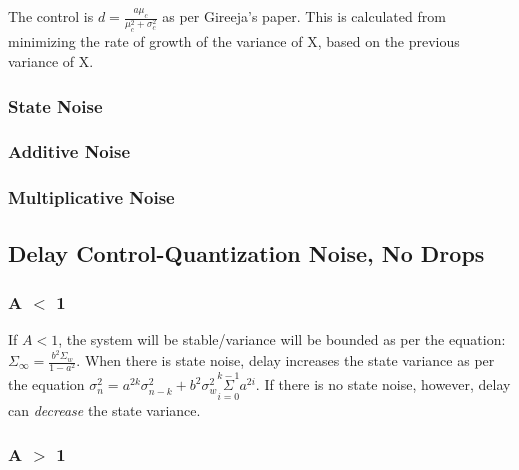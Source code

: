 \documentclass[leqno,twocolumn]{article}
\begin{document}
The control is $d = \frac{a\mu_c}{\mu_c^2+\sigma_c^2}$ as per Gireeja's paper. This is calculated from minimizing the rate of growth of the variance of X, based on the previous variance of X.

\subsubsection{State Noise}


\subsubsection{Additive Noise}

\subsubsection{Multiplicative Noise}

\subsection{Delay Control-Quantization Noise, No Drops}
\subsubsection{A $<$ 1}
If $A < 1$, the system will be stable/variance will be bounded as per the equation: $\Sigma_\infty = \frac{b^2\Sigma_w}{1-a^2}$. When there is state noise, delay increases the state variance as per the equation $\sigma^2_{n} = a^{2k}\sigma^2_{n-k} + b^2\sigma^2_w \overset{k-1}{\underset{i=0}{\Sigma}} a^{2i} $. If there is no state noise, however, delay can \textit{decrease} the state variance.

\subsubsection{A $>$ 1}
\end{document}
